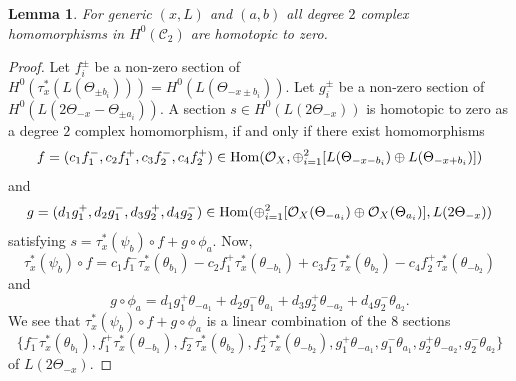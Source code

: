 \documentclass[12pt]{amsart}
\numberwithin{equation}{subsection}
\theoremstyle{plain}
\newtheorem{lem}[thm]{Lemma}
\theoremstyle{definition}
\newcommand{\C}{{\mathcal C}}
\newcommand{\StructureSheaf}[1]{{\mathcal O}_{#1}}
\newcommand{\Hom}{{\rm Hom}}
\begin{document}
{\begin{lem}
\label{lemma-rank-0}
For generic $(x,L)$ and $(a,b)$ all degree $2$ complex homomorphisms in $H^0(\C_2)$ are homotopic to zero. 
\end{lem}

\begin{proof}
Let $f_i^{\pm}$ be a non-zero section of $H^0(\tau_x^*(L(\Theta_{\pm b_i})))=H^0(L(\Theta_{-x\pm b_i}))$.
Let $g_i^{\pm}$ be a non-zero section of $H^0(L(2\Theta_{-x}-\Theta_{\pm a_i}))$.
A section $s\in H^0(L(2\Theta_{-x}))$ is homotopic to zero as a degree $2$ complex homomorphism, if and only if there exist homomorphisms 
\[
f=(c_1f_1^-,c_2f_1^+,c_3f_2^-,c_4f_2^+)\in \Hom(\StructureSheaf{X},\oplus_{i=1}^2[L(\Theta_{-x-b_i})\oplus L(\Theta_{-x+b_i})])
\]
and
\[
g=(d_1g^+_1,d_2g^-_1,d_3g^+_2,d_4g^-_2)\in
\Hom(\oplus_{i=1}^2 [\StructureSheaf{X}(\Theta_{-a_i})\oplus \StructureSheaf{X}(\Theta_{a_i})],L(2\Theta_{-x}))
\]
satisfying $s=\tau_x^*(\psi_b)\circ f+g\circ \phi_a$. Now,
\[
\tau_x^*(\psi_b)\circ f=
c_1f_1^-\tau_x^*(\theta_{b_1})-c_2f_1^+\tau_x^*(\theta_{-b_1})+
c_3f_2^-\tau_x^*(\theta_{b_2})-c_4f_2^+\tau_x^*(\theta_{-b_2})
\]
and
\[
g\circ \phi_a=
d_1g_1^+\theta_{-a_1}+d_2g_1^-\theta_{a_1}+d_3g_2^+\theta_{-a_2}+d_4g_2^-\theta_{a_2}.
\]
We see that $\tau_x^*(\psi_b)\circ f+g\circ \phi_a$ is a linear combination of the $8$ sections 
\begin{equation}
\label{eq-8-sections}
\{f_1^-\tau_x^*(\theta_{b_1}), f_1^+\tau_x^*(\theta_{-b_1}), f_2^-\tau_x^*(\theta_{b_2}), 
f_2^+\tau_x^*(\theta_{-b_2}), 
g_1^+\theta_{-a_1}, g_1^-\theta_{a_1}, g_2^+\theta_{-a_2}, g_2^-\theta_{a_2}
\}
\end{equation}
of $L(2\Theta_{-x})$. 


\end{proof}}
\end{document}
